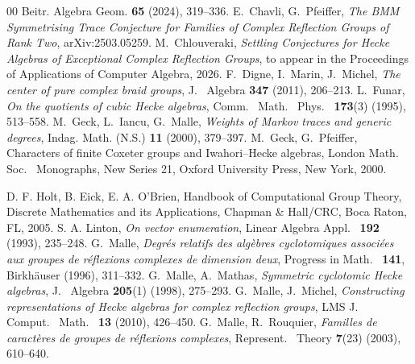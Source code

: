 \documentclass[11pt, reqno]{amsart}
\numberwithin{equation}{section}
\theoremstyle{remark}
\begin{document}
\begin{thebibliography}{00}
	Beitr. Algebra Geom. \textbf{65} (2024), 319--336.
	E.~Chavli, G.~Pfeiffer,
	\emph{The BMM Symmetrising Trace Conjecture for Families of Complex Reflection Groups of Rank Two},
	arXiv:2503.05259.
	 M.~Chlouveraki, \emph{Settling Conjectures for Hecke Algebras of Exceptional Complex Reflection Groups}, to appear in the Proceedings of Applications of Computer Algebra, 2026.
	F.~Digne, I.~Marin, J.~Michel, \emph{The  center  of  pure  complex  braid  groups}, J.~ Algebra {\bf 347} (2011), 206--213.
	 L.~Funar, \emph{On the quotients of cubic Hecke algebras}, Comm.~ Math.~  Phys.~ {\bf 173}(3) (1995), 513--558.
	 M.~Geck, L.~Iancu, G.~Malle, \emph{Weights of Markov traces and generic degrees}, Indag. Math. (N.S.)
	{\bf 11} (2000), 379--397.
	 M.~Geck, G.~Pfeiffer, Characters of finite Coxeter groups and Iwahori--Hecke algebras, London Math.~ Soc.~ Monographs, New Series 21, Oxford University Press, New York, 2000.
	
	 D. F. Holt, B. Eick, E. A. O'Brien, Handbook of Computational Group Theory, Discrete Mathematics and its Applications, Chapman \& Hall/CRC, Boca Raton, FL, 2005.
	 S. A. Linton, \emph{On vector enumeration}, Linear Algebra Appl.~ {\bf 192} (1993), 235--248.
	  G.~Malle, \emph{Degr{\'e}s relatifs des alg{\`e}bres cyclotomiques associ{\'e}es aux groupes de r{\'e}flexions complexes de dimension deux}, Progress in
	Math.~ {\bf 141}, Birkh{\"a}user (1996), 311--332.
	 G.~Malle, A.~Mathas, \emph{Symmetric cyclotomic Hecke algebras}, J.~ Algebra {\bf 205}(1) (1998), 275--293.
	 G.~Malle, J.~Michel, \emph{Constructing representations of Hecke algebras for complex reflection groups}, LMS J.~ Comput.~ Math.~ {\bf 13} (2010), 426--450.
	G.~Malle, R.~Rouquier, \emph{
		Familles de caract\`eres de groupes de réflexions complexes}, Represent.~ Theory 
	{\bf 7}(23) (2003), 610--640.
	

\end{thebibliography}
\end{document}

